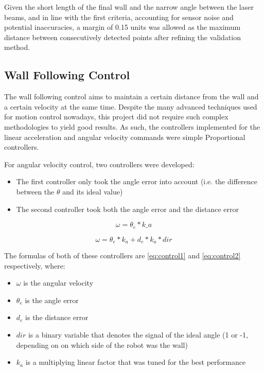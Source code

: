 \documentclass[conference]{IEEEtran}
\begin{document}
Given the short length of the final wall and the narrow angle between the laser beams, and in line with the first criteria, accounting for sensor noise and potential inaccuracies, a margin of 0.15 units was allowed as the maximum distance between consecutively detected points after refining the validation method.

\subsection{Wall Following Control}

The wall following control aims to maintain a certain distance from the wall and a certain velocity at the same time. Despite the many advanced techniques used for motion control nowadays, this project did not require such complex methodologies to yield good results. As such, the controllers implemented for the linear acceleration and angular velocity commands were simple Proportional controllers. 

For angular velocity control, two controllers were developed:

\begin{itemize}
    \item The first controller only took the angle error into account (i.e. the difference between the $\theta$ and its ideal value)
    \item The second controller took both the angle error and the distance error
\end{itemize}

\begin{equation} \label{eq:control1}
    \omega = \theta_e * k\_a
\end{equation}

\begin{equation} \label{eq:control2}
    \omega = \theta_e * k_a + d_e * k_a * dir
\end{equation}

The formulas of both of these controllers are \ref{eq:control1} and \ref{eq:control2} respectively, where:
\begin{itemize}
    \item $\omega$ is the angular velocity
    \item $\theta_e$ is the angle error
    \item $d_e$ is the distance error
    \item $dir$ is a binary variable that denotes the signal of the ideal angle (1 or -1, depending on on which side of the robot was the wall)
    \item $k_a$ is a multiplying linear factor that was tuned for the best performance  %
\end{itemize}
\end{document}
